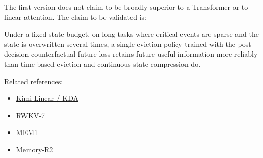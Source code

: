 The first version does not claim to be broadly superior to a Transformer or to linear attention. The claim to be validated is:

\begin{notesquote}
Under a fixed state budget, on long tasks where critical events are sparse and the state is overwritten several times, a single-eviction policy trained with the post-decision counterfactual future loss retains future-useful information more reliably than time-based eviction and continuous state compression do.
\end{notesquote}

Related references:

\begin{itemize}
  \item \href{https://arxiv.org/abs/2510.26692}{Kimi Linear / KDA}
  \item \href{https://arxiv.org/abs/2503.14456}{RWKV-7}
  \item \href{https://arxiv.org/abs/2506.15841}{MEM1}
  \item \href{https://arxiv.org/abs/2605.21768}{Memory-R2}
\end{itemize}
